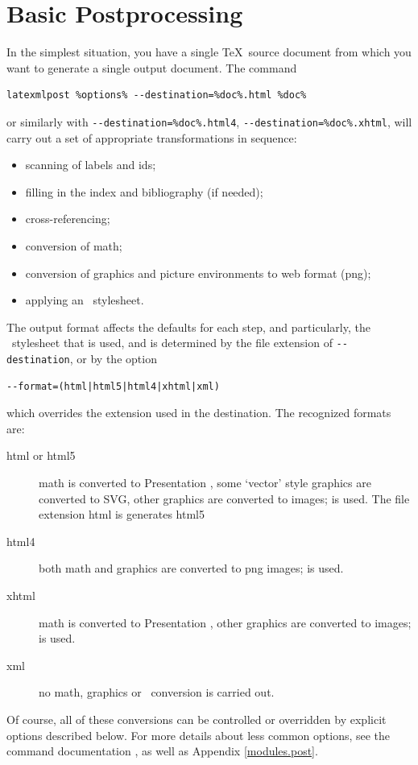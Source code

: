 \documentclass{book}
\newcommand{\shellcode}{\lstinline[style=shell]}
\begin{document}
\section[Postprocessing]{Basic Postprocessing}\label{usage.post}
In the simplest situation, you have a single \TeX\ source document
from which you want to generate a single output document.
The command
\begin{lstlisting}[style=shell]
latexmlpost %options% --destination=%doc%.html %doc%
\end{lstlisting}
or similarly with
\shellcode|--destination=%
\shellcode|--destination=%
will carry out a set of appropriate transformations in sequence:
\begin{itemize}
  \item scanning of labels and ids;
  \item filling in the index and bibliography (if needed);
  \item cross-referencing;
  \item conversion of math;
  \item conversion of graphics and picture environments to web format (png);
  \item applying an \XSLT\ stylesheet.
\end{itemize}
The output format affects the defaults for each step, and particularly,
the \XSLT\ stylesheet that is used, and is determined
by the file extension of \shellcode{--destination}, or by the option
\begin{lstlisting}[style=shell]
--format=(html|html5|html4|xhtml|xml)
\end{lstlisting}
which overrides the extension used in the destination. The recognized formats are:
\begin{description}
 \item[html or html5] math is converted to Presentation \MathML,
     some `vector' style graphics are converted to SVG,
     other graphics are converted to images;
      is used.
     The file extension html is generates html5
 \item[html4] both math and graphics are converted to png images;
     is used.
 \item[xhtml] math is converted to Presentation \MathML, other graphics are converted to images;
       is used.
 \item[xml] no math, graphics or \XSLT\ conversion is carried out.
\end{description}
Of course, all of these conversions can be controlled or overridden
by explicit options described below.
For more details about less common options, see the command
documentation , as well as Appendix \ref{modules.post}.
\end{document}
